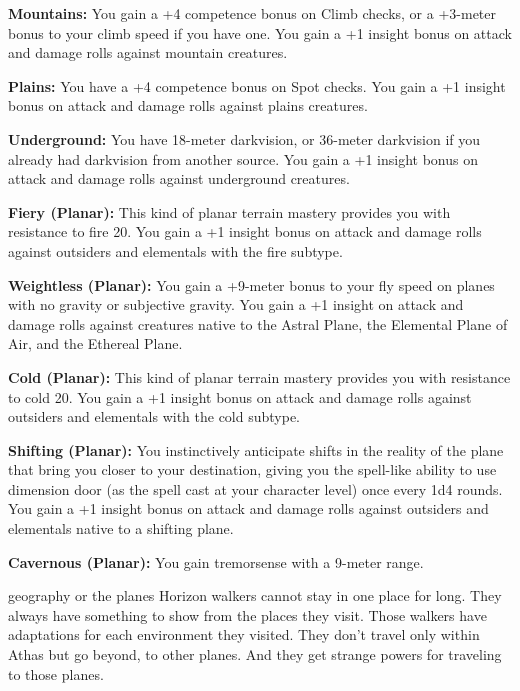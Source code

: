 {\textbf{Mountains:} You gain a +4 competence bonus on Climb checks, or a +3-meter bonus to your climb speed if you have one. You gain a +1 insight bonus on attack and damage rolls against mountain creatures.

\textbf{Plains:} You have a +4 competence bonus on Spot checks. You gain a +1 insight bonus on attack and damage rolls against plains creatures.

\textbf{Underground:} You have 18-meter darkvision, or 36-meter darkvision if you already had darkvision from another source. You gain a +1 insight bonus on attack and damage rolls against underground creatures.

\textbf{Fiery (Planar):} This kind of planar terrain mastery provides you with resistance to fire 20. You gain a +1 insight bonus on attack and damage rolls against outsiders and elementals with the fire subtype.

\textbf{Weightless (Planar):} You gain a +9-meter bonus to your fly speed on planes with no gravity or subjective gravity. You gain a +1 insight on attack and damage rolls against creatures native to the Astral Plane, the Elemental Plane of Air, and the Ethereal Plane.

\textbf{Cold (Planar):} This kind of planar terrain mastery provides you with resistance to cold 20. You gain a +1 insight bonus on attack and damage rolls against outsiders and elementals with the cold subtype.

\textbf{Shifting (Planar):} You instinctively anticipate shifts in the reality of the plane that bring you closer to your destination, giving you the spell-like ability to use dimension door (as the spell cast at your character level) once every 1d4 rounds. You gain a +1 insight bonus on attack and damage rolls against outsiders and elementals native to a shifting plane.

\textbf{Cavernous (Planar):} You gain tremorsense with a 9-meter range.
}
{}
{geography or the planes}
{Horizon walkers cannot stay in one place for long. They always have something to show from the places they visit.}
{Those walkers have adaptations for each environment they visited.}
{They don't travel only within Athas but go beyond, to other planes. And they get strange powers for traveling to those planes.}